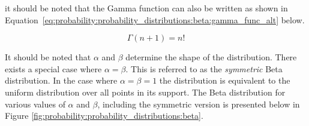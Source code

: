 it should be noted that the Gamma function can also be written as shown in Equation~\eqref{eq:probability:probability_distributions:beta:gamma_func_alt} below.

\begin{equation}
      \label{eq:probability:probability_distributions:beta:gamma_func_alt}
      \Gamma(n+1) = n!
\end{equation}

It should be noted that $\alpha$ and $\beta$ determine the shape of the distribution. There exists a special case where $\alpha = \beta$. This is referred to as the \textit{symmetric} Beta distribution. In the case where $\alpha = \beta = 1$ the distribution is equivalent to the uniform distribution over all points in its support. The Beta distribution for various values of $\alpha$ and $\beta$, including the symmetric version is presented below in Figure \ref{fig:probability:probability_distributions:beta}.

